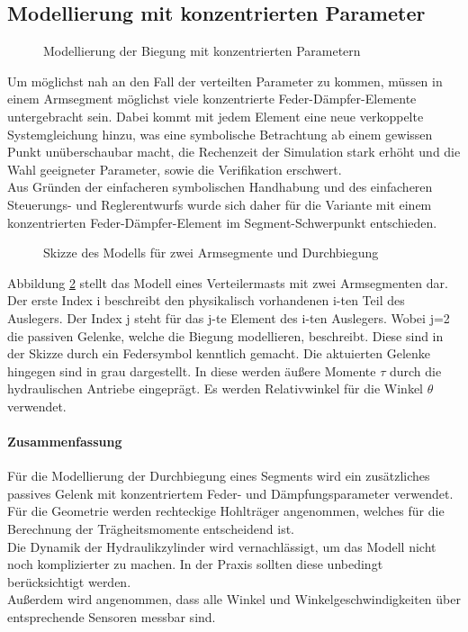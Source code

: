 \subsection{Modellierung mit konzentrierten Parameter}
\begin{figure}[!h]
\centering
\def\svgscale{0.8}

\caption{Modellierung der Biegung mit konzentrierten Parametern}
\label{fig:KonzPara}
\end{figure}

Um möglichst nah an den Fall der verteilten Parameter zu kommen, müssen in einem Armsegment möglichst viele konzentrierte Feder-Dämpfer-Elemente untergebracht sein. Dabei kommt mit jedem Element eine neue verkoppelte Systemgleichung hinzu, was eine symbolische Betrachtung ab einem gewissen Punkt unüberschaubar macht, die Rechenzeit der Simulation stark erhöht und die Wahl geeigneter Parameter, sowie die Verifikation erschwert.\\
Aus Gründen der einfacheren symbolischen Handhabung und des einfacheren Steuerungs- und Reglerentwurfs wurde sich daher für die Variante mit einem konzentrierten Feder-Dämpfer-Element im Segment-Schwerpunkt entschieden.
\begin{figure}[h!]
\centering
\def\svgscale{0.8}

\caption{Skizze des Modells für zwei Armsegmente und Durchbiegung}
\label{fig:Skizze}
\end{figure}


Abbildung \ref{fig:Skizze} stellt das Modell eines Verteilermasts mit zwei Armsegmenten dar. Der erste Index i beschreibt den physikalisch vorhandenen i-ten Teil des Auslegers. Der Index j steht für das j-te Element des i-ten Auslegers. Wobei j=2 die passiven Gelenke, welche die Biegung modellieren, beschreibt. Diese sind in der Skizze durch ein Federsymbol kenntlich gemacht. Die aktuierten Gelenke hingegen sind in grau dargestellt. In diese werden äußere Momente $\tau$ durch die hydraulischen Antriebe eingeprägt. Es werden Relativwinkel für die Winkel $\theta$ verwendet.\\

\paragraph{Zusammenfassung}
Für die Modellierung der Durchbiegung eines Segments wird ein zusätzliches passives Gelenk mit konzentriertem Feder- und Dämpfungsparameter verwendet.\\
Für die Geometrie werden rechteckige Hohlträger angenommen, welches für die Berechnung der Trägheitsmomente entscheidend ist.\\
Die Dynamik der Hydraulikzylinder wird vernachlässigt, um das Modell nicht noch komplizierter zu machen. In der Praxis sollten diese unbedingt berücksichtigt werden.\\
Außerdem wird angenommen, dass alle Winkel und Winkelgeschwindigkeiten über entsprechende Sensoren messbar sind.

